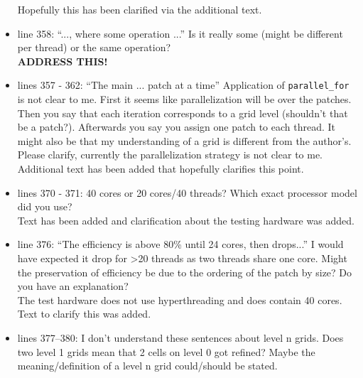 \documentclass{letter}
\newcommand{\alert}[1]{\textbf{\color{red} #1}}
\begin{document}
\begin{letter}
\begin{itemize}
    Hopefully this has been clarified via the additional text. \\

    \item line 358:  ``..., where some operation ...'' Is it really some (might be
    different per thread) or the same operation? \\

    \alert{ADDRESS THIS!} \\

    \item lines 357 - 362:  ``The main ... patch at a time'' Application of
    \texttt{parallel\_for} is not clear to me. First it seems like
    parallelization will be over the patches. Then you say that each iteration
    corresponds to a grid level (shouldn't that be a patch?). Afterwards you say
    you assign one patch to each thread. It might also be that my understanding
    of a grid is different from the author's. Please clarify, currently the
    parallelization strategy is not clear to me. \\

    Additional text has been added that hopefully clarifies this point. \\

    \item lines 370 - 371: 40 cores or 20 cores/40 threads? Which exact processor
    model did you use? \\

    Text has been added and clarification about the testing hardware was added.
    \\

    \item line 376: ``The efficiency is above 80\% until 24 cores, then drops...'' 
    I would have expected it drop for >20 threads as two threads share one core.
    Might the preservation of efficiency be due to the ordering of the patch by
    size? Do you have an explanation? \\

    The test hardware does not use hyperthreading and does contain 40 cores. 
    Text to clarify this was added. \\

    \item lines 377--380:  I don't understand these sentences about level n grids.
    Does two level 1 grids mean that 2 cells on level 0 got refined? Maybe the
    meaning/definition of a level n grid could/should be stated. \\


\end{itemize}
\end{letter}
\end{document}

